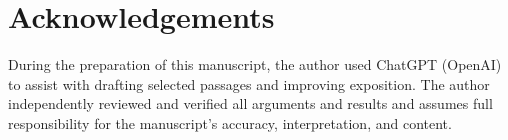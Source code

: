 \section*{Acknowledgements}

During the preparation of this manuscript, the author used ChatGPT (OpenAI) to assist with drafting selected passages and improving exposition. The author independently reviewed and verified all arguments and results and assumes full responsibility for the manuscript's accuracy, interpretation, and content.
